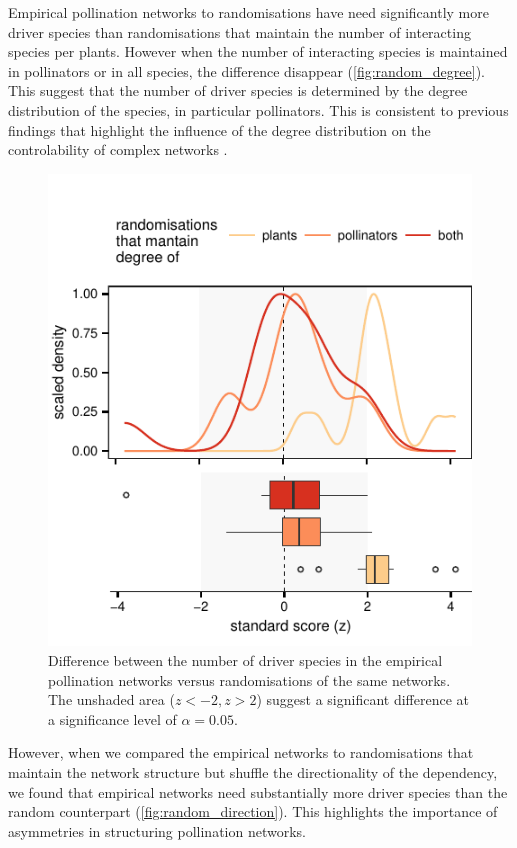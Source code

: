 \documentclass[a4paper,10pt]{article}
\begin{document}
Empirical pollination networks to randomisations have need significantly more driver species than randomisations that maintain the number of interacting species per plants. However when the number of interacting species is maintained in pollinators or in all species, the difference disappear (\autoref{fig:random_degree}). This suggest that the number of driver species is determined by the degree distribution of the species, in particular pollinators. This is consistent to previous findings that highlight the influence of the degree distribution on the controlability of complex networks \autocite{Liu2011, Benavides2015}. 

\begin{figure}
    \centering
		\includegraphics{random_degree}
    \caption{
    Difference between the number of driver species in the empirical pollination networks versus randomisations of the same networks. The unshaded area ($z < -2 , z > 2$) suggest a significant difference at a significance level of $\alpha = 0.05$.
    }
    \label{fig:random_degree}
\end{figure} 

However, when we compared the empirical networks to randomisations that maintain the network structure but shuffle the directionality of the dependency, we found that empirical networks need substantially more driver species than the random counterpart (\autoref{fig:random_direction}). This highlights the importance of asymmetries in structuring pollination networks. 
\end{document}
